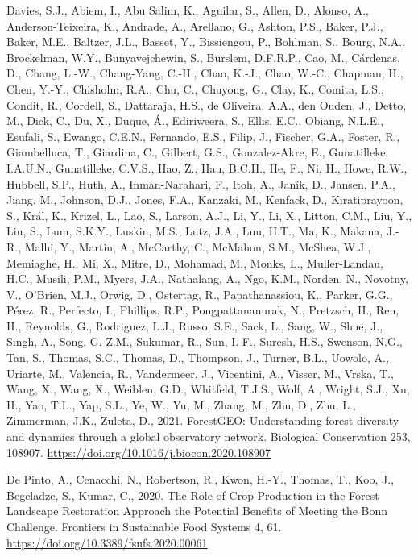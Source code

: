 \documentclass[
  12pt,
]{article}
\newlength{\cslhangindent}
\newlength{\cslentryspacingunit} %
\newenvironment{CSLReferences}[2] %
 {%
  \setlength{\parindent}{0pt}
  \ifodd #1
  \let\oldpar\par
  \def\par{\hangindent=\cslhangindent\oldpar}
  \fi
  \setlength{\parskip}{#2\cslentryspacingunit}
 }%
 {}
\begin{document}
\begin{CSLReferences}{1}{0}
\leavevmode{}%
Davies, S.J., Abiem, I., Abu Salim, K., Aguilar, S., Allen, D., Alonso, A., Anderson-Teixeira, K., Andrade, A., Arellano, G., Ashton, P.S., Baker, P.J., Baker, M.E., Baltzer, J.L., Basset, Y., Bissiengou, P., Bohlman, S., Bourg, N.A., Brockelman, W.Y., Bunyavejchewin, S., Burslem, D.F.R.P., Cao, M., Cárdenas, D., Chang, L.-W., Chang-Yang, C.-H., Chao, K.-J., Chao, W.-C., Chapman, H., Chen, Y.-Y., Chisholm, R.A., Chu, C., Chuyong, G., Clay, K., Comita, L.S., Condit, R., Cordell, S., Dattaraja, H.S., de Oliveira, A.A., den Ouden, J., Detto, M., Dick, C., Du, X., Duque, Á., Ediriweera, S., Ellis, E.C., Obiang, N.L.E., Esufali, S., Ewango, C.E.N., Fernando, E.S., Filip, J., Fischer, G.A., Foster, R., Giambelluca, T., Giardina, C., Gilbert, G.S., Gonzalez-Akre, E., Gunatilleke, I.A.U.N., Gunatilleke, C.V.S., Hao, Z., Hau, B.C.H., He, F., Ni, H., Howe, R.W., Hubbell, S.P., Huth, A., Inman-Narahari, F., Itoh, A., Janík, D., Jansen, P.A., Jiang, M., Johnson, D.J., Jones, F.A., Kanzaki, M., Kenfack, D., Kiratiprayoon, S., Král, K., Krizel, L., Lao, S., Larson, A.J., Li, Y., Li, X., Litton, C.M., Liu, Y., Liu, S., Lum, S.K.Y., Luskin, M.S., Lutz, J.A., Luu, H.T., Ma, K., Makana, J.-R., Malhi, Y., Martin, A., McCarthy, C., McMahon, S.M., McShea, W.J., Memiaghe, H., Mi, X., Mitre, D., Mohamad, M., Monks, L., Muller-Landau, H.C., Musili, P.M., Myers, J.A., Nathalang, A., Ngo, K.M., Norden, N., Novotny, V., O'Brien, M.J., Orwig, D., Ostertag, R., Papathanassiou, K., Parker, G.G., Pérez, R., Perfecto, I., Phillips, R.P., Pongpattananurak, N., Pretzsch, H., Ren, H., Reynolds, G., Rodriguez, L.J., Russo, S.E., Sack, L., Sang, W., Shue, J., Singh, A., Song, G.-Z.M., Sukumar, R., Sun, I.-F., Suresh, H.S., Swenson, N.G., Tan, S., Thomas, S.C., Thomas, D., Thompson, J., Turner, B.L., Uowolo, A., Uriarte, M., Valencia, R., Vandermeer, J., Vicentini, A., Visser, M., Vrska, T., Wang, X., Wang, X., Weiblen, G.D., Whitfeld, T.J.S., Wolf, A., Wright, S.J., Xu, H., Yao, T.L., Yap, S.L., Ye, W., Yu, M., Zhang, M., Zhu, D., Zhu, L., Zimmerman, J.K., Zuleta, D., 2021. {ForestGEO}: {Understanding} forest diversity and dynamics through a global observatory network. Biological Conservation 253, 108907. \url{https://doi.org/10.1016/j.biocon.2020.108907}

\leavevmode{}%
De Pinto, A., Cenacchi, N., Robertson, R., Kwon, H.-Y., Thomas, T., Koo, J., Begeladze, S., Kumar, C., 2020. The {Role} of {Crop Production} in the {Forest Landscape Restoration Approach} the {Potential Benefits} of {Meeting} the {Bonn Challenge}. Frontiers in Sustainable Food Systems 4, 61. \url{https://doi.org/10.3389/fsufs.2020.00061}


\end{CSLReferences}
\end{document}
